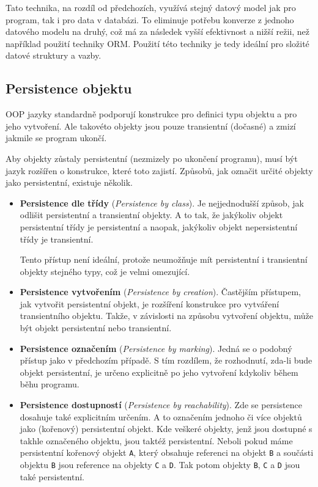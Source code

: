 Tato technika, na rozdíl od předchozích, využívá stejný datový model jak pro program, tak i pro data v databázi. To eliminuje potřebu konverze z jednoho datového modelu na druhý, což má za následek vyšší efektivnost a nižší režii, než například použití techniky ORM. Použití této techniky je tedy ideální pro složité datové struktury a vazby.

\subsection{Persistence objektu}
OOP jazyky standardně podporují konstrukce pro definici typu objektu a pro jeho vytvoření. Ale takovéto objekty jsou pouze transientní (dočasné) a zmizí jakmile se program ukončí.

Aby objekty zůstaly persistentní (nezmizely po ukončení programu), musí být jazyk rozšířen o konstrukce, které toto zajistí. Způsobů, jak označit určité objekty jako persistentní, existuje několik.
\begin{itemize}
  \item \textbf{Persistence dle třídy} (\emph{Persistence by class}). Je nejjednodušší způsob, jak odlišit persistentní a transientní objekty. A to tak, že jakýkoliv objekt persistentní třídy je persistentní a naopak, jakýkoliv objekt nepersistentní třídy je transientní.
  
  Tento přístup není ideální, protože neumožňuje mít persistentní i transientní objekty stejného typy, což je velmi omezující.
  \item \textbf{Persistence vytvořením} (\emph{Persistence by creation}). Častějším přístupem, jak vytvořit persistentní objekt, je rozšíření konstrukce pro vytváření transientního objektu. Takže, v závislosti na způsobu vytvoření objektu, může být objekt persistentní nebo transientní.
  \item \textbf{Persistence označením} (\emph{Persistence by marking}). Jedná se o podobný přístup jako v předchozím případě. S tím rozdílem, že rozhodnutí, zda-li bude objekt persistentní, je určeno explicitně po jeho vytvoření kdykoliv během běhu programu.
  \item \textbf{Persistence dostupností} (\emph{Persistence by reachability}). Zde se persistence dosahuje také explicitním určením. A to označením jednoho či více objektů jako (kořenový) persistentní objekt. Kde veškeré objekty, jenž jsou dostupné s takhle označeného objektu, jsou taktéž persistentní. Neboli pokud máme persistentní kořenový objekt \texttt{A}, který obsahuje referenci na objekt \texttt{B} a součásti objektu \texttt{B} jsou reference na objekty \texttt{C} a \texttt{D}. Tak potom objekty \texttt{B}, \texttt{C} a \texttt{D} jsou také persistentní.
\end{itemize}


